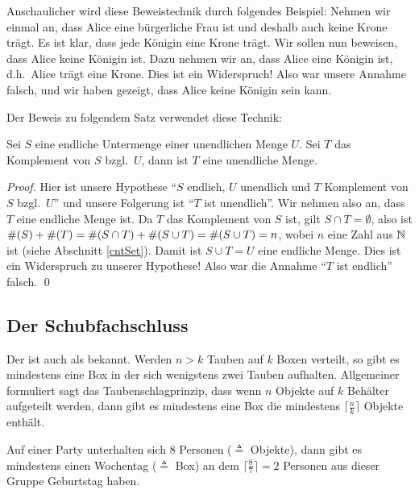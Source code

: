 Anschaulicher wird diese Beweistechnik durch folgendes Beispiel:
Nehmen wir einmal an, dass Alice eine bürgerliche Frau ist und deshalb
auch keine Krone trägt. Es ist klar, dass jede Königin eine Krone
trägt. Wir sollen nun beweisen, dass Alice keine Königin ist. Dazu
nehmen wir an, dass Alice eine Königin ist, d.h.~Alice trägt eine
Krone. Dies ist ein Widerspruch! Also war unsere Annahme falsch, und
wir haben gezeigt, dass Alice keine Königin sein kann.

\goodbreak
\noindent Der Beweis zu folgendem Satz verwendet diese Technik:
\begin{theorem}
Sei $S$ eine endliche Untermenge einer unendlichen Menge $U$. Sei $T$
das Komplement von $S$ bzgl.~$U$, dann ist $T$ eine unendliche Menge.
\end{theorem}

\begin{proof}
Hier ist unsere Hypothese "`$S$ endlich, $U$ unendlich und $T$
Komplement von $S$ bzgl.~$U$"' und unsere Folgerung ist "`$T$ ist
unendlich"'. Wir nehmen also an, dass $T$ eine endliche Menge ist. Da
$T$ das Komplement von $S$ ist, gilt $S \cap T = \emptyset$, also ist
$\#(S) + \#(T) = \# (S \cap T) + \# (S \cup T) = \# (S \cup
T) = n$, wobei $n$ eine Zahl aus $\mathbb N$ ist (siehe
Abschnitt \ref{cntSet}). Damit ist $S \cup T = U$ eine endliche
Menge. Dies ist ein Widerspruch zu unserer Hypothese! Also war die
Annahme "`$T$ ist endlich"' falsch. \qed
\end{proof}

\subsection{Der Schubfachschluss}
\label{Schubfachschluss}
Der  ist auch 
als  
bekannt. Werden $n > k$ Tauben auf $k$ Boxen verteilt, so gibt es 
mindestens eine Box in der sich wenigstens zwei Tauben aufhalten. 
Allgemeiner formuliert sagt das Taubenschlagprinzip, dass wenn $n$ 
Objekte auf $k$ Behälter aufgeteilt werden, dann gibt es mindestens 
eine Box die mindestens $\lceil \frac{n}{k} \rceil$ Objekte enthält.

\begin{example}
Auf einer Party unterhalten sich $8$ Personen ($\triangleq$ Objekte),
dann gibt es mindestens einen Wochentag ($\triangleq$ Box) an dem
$\lceil \frac{8}{7} \rceil =2$ Personen aus dieser Gruppe Geburtstag
haben.
\end{example}

